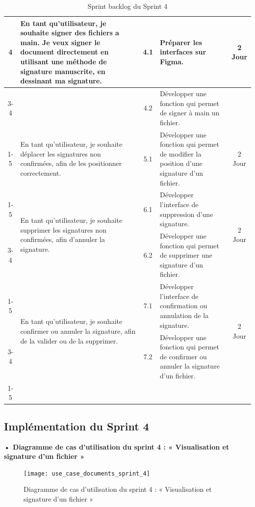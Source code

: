 \begin{adjustwidth}{-1cm}{}
\begin{longtable}{|c|p{6cm}|c|p{6cm}|c|}
      \multirow{3}{*}{4} & En tant qu'utilisateur, je souhaite signer des fichiers a main. Je veux signer le document directement en utilisant une méthode de signature manuscrite, en dessinant ma signature. & 4.1 & Préparer les interfaces sur Figma. & \multirow{3}{*}{2 Jour} \\
      \cline{3-4}
      & & 4.2 & Développer une fonction qui permet de signer à main un fichier. & \\
      \cline{1-5}

      \multirow{1}{*}{5} & En tant qu'utilisateur, je souhaite déplacer les signatures non confirmées, afin de les positionner correctement.& 5.1 & Développer une fonction qui permet de modifier la position d'une signature d'un fichier. & \multirow{1}{*}{2 Jour} \\
      \cline{1-5}

      \multirow{2}{*}{6} & \multirow{2}{6cm}{En tant qu'utilisateur, je souhaite supprimer les signatures non confirmées, afin d'annuler la signature.}& 6.1 & Développer l'interface de suppression d'une signature. & \multirow{2}{*}{2 Jour} \\
      \cline{3-4}
      & & 6.2 & Développer une fonction qui permet de supprimer une signature d'un fichier. & \\
      \cline{1-5}

      \multirow{2}{*}{7} &\multirow{2}{6cm}{ En tant qu'utilisateur, je souhaite confirmer ou annuler la signature, afin de la valider ou de la supprimer.}& 7.1 & Développer l'interface de confirmation ou annulation de la signature. & \multirow{2}{*}{2 Jour} \\
      \cline{3-4}
      & & 7.2 & Développer une fonction qui permet de confirmer ou annuler la signature d'un fichier. & \\
      \cline{1-5}
      
  \hline
  \caption{Sprint backlog du Sprint 4}
  \label{tab:sprint-backlog-4}
\end{longtable}
\end{adjustwidth}

\subsection{Implémentation du Sprint 4}
\textbf{•	Diagramme de cas d'utilisation du sprint 4 : « Visualisation et signature d'un fichier »}

\begin{figure}[H]
  \centering
  \texttt{[image: use\_case\_documents\_sprint\_4]}
  \caption{Diagramme de cas d'utilisation du sprint 4 : « Visualisation et signature d'un fichier »}
  \label{fig:UseCaseDiagram4}
\end{figure}
